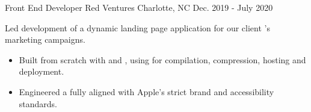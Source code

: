 \begin{cventries}
  \cventry
    {Front End Developer} %
    {Red Ventures} %
    {Charlotte, NC} %
    {Dec. 2019 - July 2020} %
    {
      \begin{cvitems} %
        \item {Led development of a dynamic landing page application for our client 's marketing campaigns.}
        \begin{itemize}[leftmargin=2.5ex, itemsep=.8mm]
          \vspace{.8mm}
          \item {Built from scratch with  and , using  for compilation, compression, hosting and deployment.}
          \item {Engineered a  fully aligned with Apple's strict brand and accessibility standards.}
          \vspace{.3mm}
        \end{itemize}
      \end{cvitems}
    }


\end{cventries}
